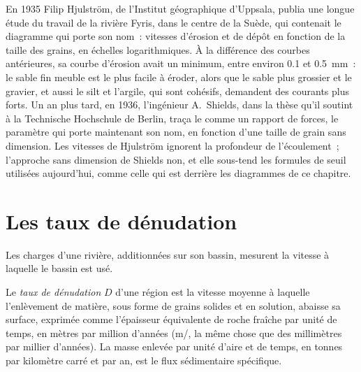 \begin{history}
En 1935 Filip Hjulström, de l'Institut géographique d'Uppsala, publia une
longue étude du travail de la rivière Fyris, dans le centre de la Suède, qui contenait
le diagramme qui porte son nom~: vitesses d'érosion et de dépôt en fonction de
la taille des grains, en échelles logarithmiques. À la différence des courbes antérieures, sa courbe d'érosion avait
un minimum, entre environ \num{0.1} et \qty{0.5}{mm}~: le sable fin meuble est le
plus facile à éroder, alors que le sable plus grossier et le gravier, et aussi le silt et l'argile, qui
sont cohésifs, demandent des courants plus forts. Un an plus tard, en 1936, l'ingénieur A.~Shields,
dans la thèse qu'il soutint à la Technische Hochschule de Berlin, traça
le  comme un rapport de forces, le paramètre qui porte maintenant
son nom, en fonction d'une taille de grain sans dimension. Les vitesses de Hjulström ignorent la
profondeur de l'écoulement~; l'approche sans dimension de Shields non, et elle sous-tend
les formules de seuil utilisées aujourd'hui, comme celle qui est derrière les diagrammes de ce
chapitre.
\end{history}

\section{Les taux de dénudation}\label{sec:b1:erosion-transport:denudation}

Les charges d'une rivière, additionnées sur son bassin, mesurent la vitesse à laquelle le bassin
est usé.

\begin{definition}\label{def:b1:erosion-transport:denudation}
Le \emph{taux de dénudation} $D$ d'une région est la vitesse moyenne
à laquelle l'enlèvement de matière, sous forme de grains solides et en solution, abaisse
sa surface, exprimée comme l'épaisseur équivalente de roche fraîche par unité de
temps, en mètres par million d'années (\unit{m/\Ma}, la même chose que des millimètres par
millier d'années). La masse enlevée par unité d'aire et de temps, en tonnes par kilomètre
carré et par an, est le flux sédimentaire spécifique.
\end{definition}

